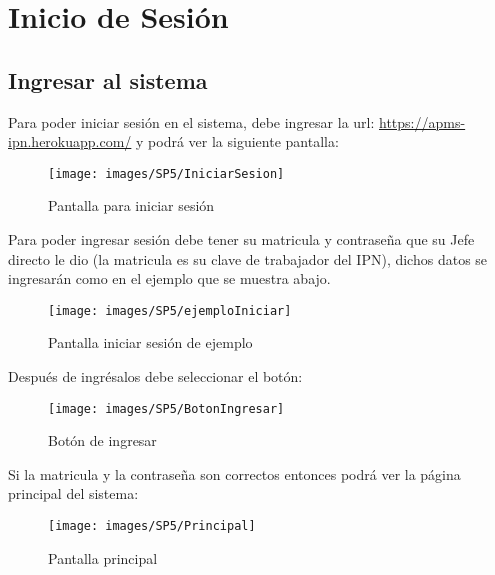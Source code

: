 \chapter{Inicio de Sesión}
    
    \section{Ingresar al sistema}
        Para poder iniciar sesión en el sistema, debe ingresar la url: \url{https://apms-ipn.herokuapp.com/} y podrá ver la siguiente pantalla:
        
        \begin{figure}[!hbtp]
            \centering
            \hypertarget{iniciarS}{\texttt{[image: images/SP5/IniciarSesion]}}
            \caption{Pantalla para iniciar sesión}
        \end{figure}
        
        Para poder ingresar sesión debe tener su matricula y contraseña que su Jefe directo le dio (la matricula es su clave de trabajador del IPN), dichos datos se ingresarán como en el ejemplo que se muestra abajo.
        
        \begin{figure}[!hbtp]
            \centering
            \hypertarget{iniciarL}{\texttt{[image: images/SP5/ejemploIniciar]}}
            \caption{Pantalla iniciar sesión de ejemplo}
        \end{figure}
        
        Después de ingrésalos debe seleccionar el botón:
        
        \begin{figure}[!hbtp]
            \centering
            \hypertarget{BotonIng}{\texttt{[image: images/SP5/BotonIngresar]}}
            \caption{Botón de ingresar}
            \label{consultarrh}
        \end{figure}
        
        Si la matricula y la contraseña son correctos entonces podrá ver la página principal del sistema:
    
        \begin{figure}[!hbtp]
            \centering
            \hypertarget{Principal}{\texttt{[image: images/SP5/Principal]}}
            \caption{Pantalla principal}
        \end{figure}
        
